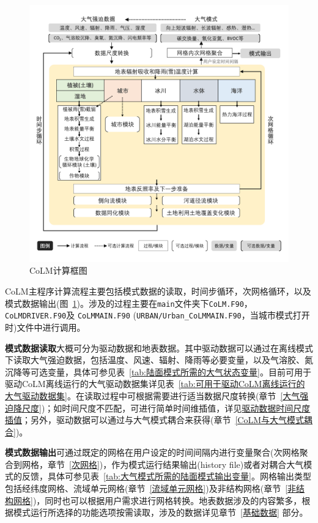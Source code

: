 {
\begin{figure}[htbp]
\centering
\includegraphics[width=\textwidth]{Figures/模式构架/CoLM计算框图_v5.png}
\caption{CoLM计算框图}
\label{fig:CoLM计算框图}
\end{figure}
}

CoLM主程序计算流程主要包括模式数据的读取，时间步循环，次网格循环，以及模式数据输出(图~\ref{fig:CoLM计算框图})。涉及的过程主要在\texttt{main}文件夹下\texttt{CoLM.F90}，\texttt{CoLMDRIVER.F90}及 \allowbreak \texttt{CoLMMAIN.F90}
\allowbreak (\texttt{URBAN\allowbreak /Urban\allowbreak \_CoLMMAIN.F90}，当城市模式打开时)文件中进行调用。

\textbf{模式数据读取}大概可分为驱动数据和地表数据。其中驱动数据可以通过在离线模式下读取大气强迫数据，包括温度、风速、辐射、降雨等必要变量，以及气溶胶、氮沉降等可选变量，具体可参见表~\ref{tab:陆面模式所需的大气状态变量}。目前可用于驱动CoLM离线运行的大气驱动数据集详见表~\ref{tab:可用于驱动CoLM离线运行的大气驱动数据集}。在读取过程中可根据需要进行适当数据尺度转换(章节~\ref{大气强迫降尺度})；如时间尺度不匹配，可进行简单时间维插值，详见\hyperlink{驱动数据时间尺度插值}{驱动数据时间尺度插值}；另外，驱动数据可以通过与大气模式耦合来获得(章节~\ref{CoLM与大气模式耦合})。

\textbf{模式数据输出}可通过既定的网格在用户设定的时间间隔内进行变量聚合(次网格聚合到网格，章节~\ref{次网格})，作为模式运行结果输出(history file)或者对耦合大气模式的反馈，具体可参见表~\ref{tab:大气模式所需的陆面模式输出变量}。网格输出类型包括经纬度网格、流域单元网格(章节~\ref{流域单元网格})及非结构网格(章节~\ref{非结构网格})，同时也可以根据用户需求进行网格转换。地表数据涉及的内容繁多，根据模式运行所选择的功能选项按需读取，涉及的数据详见章节~\ref{基础数据} 部分。

